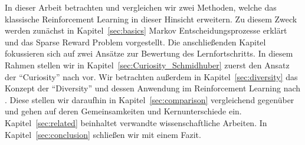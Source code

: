 In dieser Arbeit betrachten und vergleichen wir zwei Methoden, welche das klassische Reinforcement Learning in dieser Hinsicht erweitern.
Zu diesem Zweck werden zunächst in Kapitel~\ref{sec:basics} Markov Entscheidungsprozesse erklärt und das Sparse Reward Problem vorgestellt.
Die anschließenden Kapitel fokussieren sich auf zwei Ansätze zur Bewertung des Lernfortschritts.
In diesem Rahmen stellen wir in Kapitel~\ref{sec:Curiosity_Schmidhuber} zuerst den Ansatz der ``Curiosity'' nach \cite{curiosity_schmidhuber} vor. 
Wir betrachten außerdem in Kapitel~\ref{sec:diversity} das Konzept der ``Diversity'' und dessen Anwendung im Reinforcement Learning nach \cite{diversity_eysenbach}.
Diese stellen wir daraufhin in Kapitel~\ref{sec:comparison} vergleichend gegenüber und gehen auf deren Gemeinsamkeiten und Kernunterschiede ein. Kapitel~\ref{sec:related} beinhaltet verwandte wissenschaftliche Arbeiten. In Kapitel~\ref{sec:conclusion} schließen wir mit einem Fazit.
